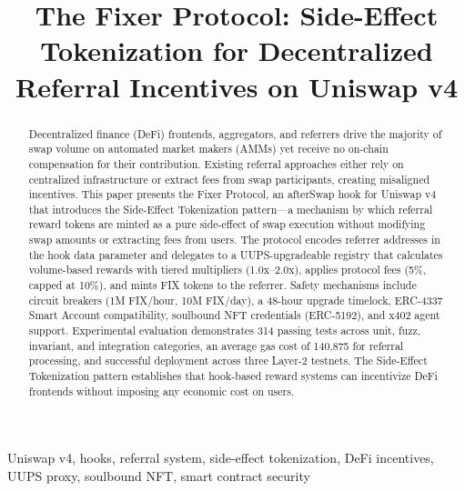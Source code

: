 \documentclass[conference]{IEEEtran}
\begin{document}
\title{The Fixer Protocol: Side-Effect Tokenization for Decentralized Referral Incentives on Uniswap v4}

\author{
}

\maketitle

\begin{abstract}
Decentralized finance (DeFi) frontends, aggregators, and referrers drive the majority of swap volume on automated market makers (AMMs) yet receive no on-chain compensation for their contribution. Existing referral approaches either rely on centralized infrastructure or extract fees from swap participants, creating misaligned incentives. This paper presents the Fixer Protocol, an afterSwap hook for Uniswap v4 that introduces the Side-Effect Tokenization pattern---a mechanism by which referral reward tokens are minted as a pure side-effect of swap execution without modifying swap amounts or extracting fees from users. The protocol encodes referrer addresses in the hook data parameter and delegates to a UUPS-upgradeable registry that calculates volume-based rewards with tiered multipliers (1.0x--2.0x), applies protocol fees (5\%, capped at 10\%), and mints FIX tokens to the referrer. Safety mechanisms include circuit breakers (1M FIX/hour, 10M FIX/day), a 48-hour upgrade timelock, ERC-4337 Smart Account compatibility, soulbound NFT credentials (ERC-5192), and x402 agent support. Experimental evaluation demonstrates 314 passing tests across unit, fuzz, invariant, and integration categories, an average gas cost of 140,875 for referral processing, and successful deployment across three Layer-2 testnets. The Side-Effect Tokenization pattern establishes that hook-based reward systems can incentivize DeFi frontends without imposing any economic cost on users.
\end{abstract}

\begin{IEEEkeywords}
Uniswap v4, hooks, referral system, side-effect tokenization, DeFi incentives, UUPS proxy, soulbound NFT, smart contract security
\end{IEEEkeywords}
\end{document}
